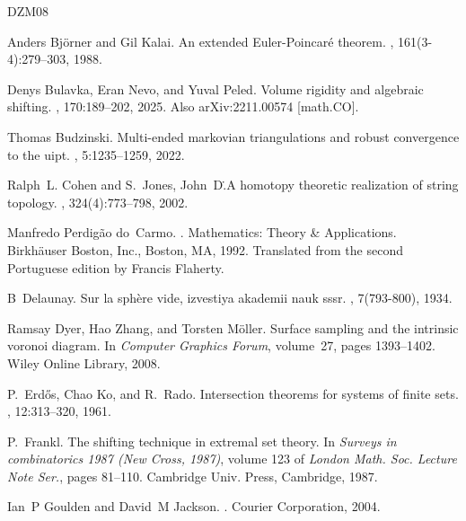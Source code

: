 \documentclass[11pt]{article}
\numberwithin{claimcounter}{theorem}
\theoremstyle{remark}
\theoremstyle{definition}
\numberwithin{theorem}{section}
\begin{document}
\begin{thebibliography}{DZM08}

Anders Bj\"{o}rner and Gil Kalai.
\newblock An extended {E}uler-{P}oincar\'{e} theorem.
, 161(3-4):279--303, 1988.

Denys Bulavka, Eran Nevo, and Yuval Peled.
\newblock Volume rigidity and algebraic shifting.
, 170:189--202, 2025.
\newblock Also arXiv:2211.00574 [math.CO].

Thomas Budzinski.
\newblock Multi-ended markovian triangulations and robust convergence to the
  uipt.
, 5:1235--1259, 2022.

Ralph~L. Cohen and S.~Jones, John~D.\.
\newblock A homotopy theoretic realization of string topology.
, 324(4):773--798, 2002.

Manfredo Perdig\~{a}o do~Carmo.
.
\newblock Mathematics: Theory \& Applications. Birkh\"{a}user Boston, Inc.,
  Boston, MA, 1992.
\newblock Translated from the second Portuguese edition by Francis Flaherty.

B~Delaunay.
\newblock Sur la sph{\`e}re vide, izvestiya akademii nauk sssr.
, 7(793-800),
  1934.

Ramsay Dyer, Hao Zhang, and Torsten M{\"o}ller.
\newblock Surface sampling and the intrinsic voronoi diagram.
\newblock In {\em Computer Graphics Forum}, volume~27, pages 1393--1402. Wiley
  Online Library, 2008.

P.~Erd{\H{o}}s, Chao Ko, and R.~Rado.
\newblock Intersection theorems for systems of finite sets.
, 12:313--320, 1961.

P.~Frankl.
\newblock The shifting technique in extremal set theory.
\newblock In {\em Surveys in combinatorics 1987 ({N}ew {C}ross, 1987)}, volume
  123 of {\em London Math. Soc. Lecture Note Ser.}, pages 81--110. Cambridge
  Univ. Press, Cambridge, 1987.

Ian~P Goulden and David~M Jackson.
.
\newblock Courier Corporation, 2004.


\end{thebibliography}
\end{document}
